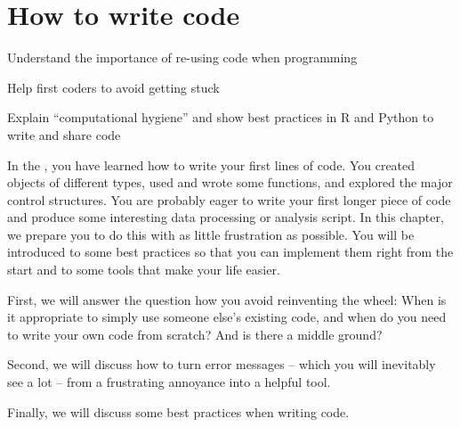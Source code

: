 \chapter{How to write code}
\label{chap:worldcode}

\begin{abstract}{Abstract}  
Programming is no longer a solitary activity, and almost all questions, problems, and error messages have been encountered and solved before. This chapter explains the most common forms of collaboration and sources of outside help, as well as giving best practices on how to write and share code yourself.
\end{abstract}


\begin{objectives}
\item Understand the importance of re-using code when programming
\item Help first coders to avoid getting stuck
\item Explain ``computational hygiene'' and show best practices in R and Python to write and share code
\end{objectives}

In the , you have learned how to write
your first lines of code.  You created objects of different types,
used and wrote some functions, and explored the major control structures.
You are probably eager to write your first longer piece of code and
produce some interesting data processing or analysis script. In this
chapter, we prepare you to do this with as little frustration as possible.
You will be introduced to some best practices so that you can implement
them right from the start and to some tools that make your life easier.

First, we will answer the question how you avoid reinventing
the wheel: When is it appropriate to simply use someone else's existing code, and
when do you need to write your own code from scratch? And is there a middle ground?

Second, we will discuss how to turn error messages -- which you will inevitably
see a lot -- from a frustrating annoyance into a helpful tool.

Finally, we will discuss some best practices when writing code.






